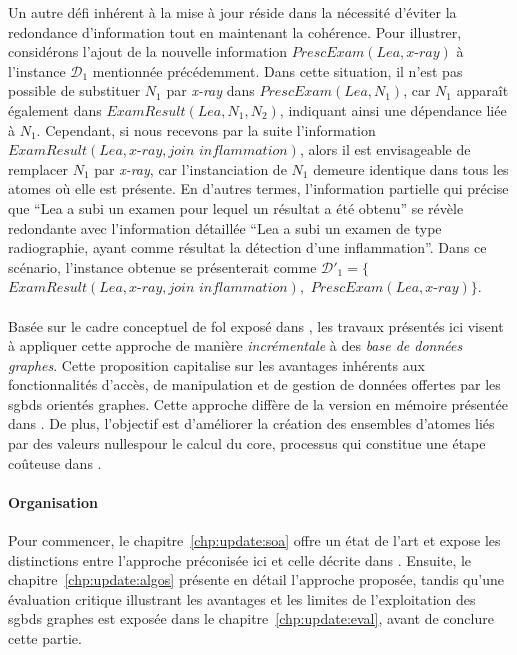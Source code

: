 Un autre défi inhérent à la mise à jour réside dans la nécessité d'éviter la redondance d'information tout en maintenant la cohérence.
Pour illustrer, considérons l'ajout de la nouvelle information $PrescExam(Lea, \textit{x-ray})$ à l'instance $\mathcal{D}_1$ mentionnée précédemment.
Dans cette situation, il n'est pas possible de substituer $N_1$ par \textit{x-ray} dans $PrescExam(Lea, N_1)$, car $N_1$ apparaît également dans $ExamResult(Lea, N_1, N_2)$, indiquant ainsi une dépendance liée à $N_1$.
Cependant, si nous recevons par la suite l'information $ExamResult(Lea, \textit{x-ray}, \textit{join inflammation})$, alors il est envisageable de remplacer $N_1$ par \textit{x-ray}, car l'instanciation de $N_1$ demeure identique dans tous les atomes où elle est présente.
En d'autres termes, l'information partielle qui précise que \enquote{Lea a subi un examen pour lequel un résultat a été obtenu} se révèle redondante avec l'information détaillée \enquote{Lea a subi un examen de type radiographie, ayant comme résultat la détection d'une inflammation}.
Dans ce scénario, l'instance obtenue se présenterait comme $\mathcal{D}'_1 = \{$$ExamResult(Lea, \textit{x-ray}, \textit{join inflammation}),$ $PrescExam(Lea, \textit{x-ray})\}$.

\paragraph{}
Basée sur le cadre conceptuel de \gls{fol} exposé dans \cite{chabinConsistentUpdatingDatabases2020}, les travaux présentés ici visent à appliquer cette approche de manière \emph{incrémentale} à des \emph{base de données graphes}.
Cette proposition capitalise sur les avantages inhérents aux fonctionnalités d'accès, de manipulation et de gestion de données offertes par les \glspl{sgbd} orientés graphes.
Cette approche diffère de la version en mémoire présentée dans \cite{chabinConsistentUpdatingDatabases2020}.
De plus, l'objectif est d'améliorer la création des ensembles d'atomes liés par des valeurs nullespour le calcul du \gls{core}, processus qui constitue une étape coûteuse dans \cite{chabinConsistentUpdatingDatabases2020}.

\paragraph{Organisation}
Pour commencer, le chapitre~\ref{chp:update:soa} offre un état de l'art et expose les distinctions entre l'approche préconisée ici et celle décrite dans \cite{chabinConsistentUpdatingDatabases2020}. Ensuite, le chapitre~\ref{chp:update:algos} présente en détail l'approche proposée, tandis qu'une évaluation critique illustrant les avantages et les limites de l'exploitation des \glspl{sgbd} graphes est exposée dans le chapitre~\ref{chp:update:eval}, avant de conclure cette partie.
